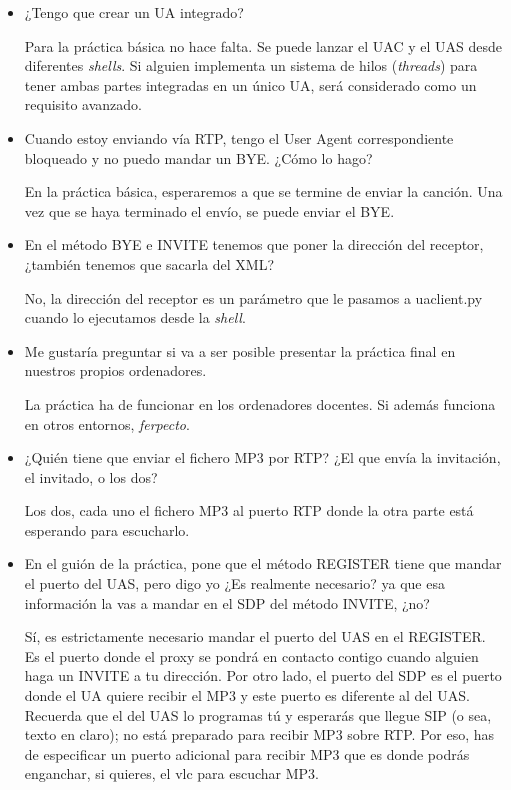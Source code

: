 \documentclass[a4paper,11pt]{article}
\begin{document}
\begin{itemize}

\item ¿Tengo que crear un UA integrado?

Para la práctica básica no hace falta. Se puede lanzar el UAC y el UAS desde diferentes \emph{shells}. Si alguien implementa un sistema de hilos (\emph{threads}) para tener ambas partes integradas en un único UA, será considerado como un requisito avanzado.

\item Cuando estoy enviando vía RTP, tengo el User Agent correspondiente bloqueado y no puedo mandar un BYE. ¿Cómo lo hago?

En la práctica básica, esperaremos a que se termine de enviar la canción. Una vez que se haya terminado el envío, se puede enviar el BYE.

\item En el método BYE e INVITE tenemos que poner la dirección del receptor, ¿también tenemos que sacarla del XML?

No, la dirección del receptor es un parámetro que le pasamos a uaclient.py cuando lo ejecutamos desde la \emph{shell}.

\item Me gustaría preguntar si va a ser posible presentar la práctica final en nuestros propios ordenadores.

La práctica ha de funcionar en los ordenadores docentes. Si además funciona
en otros entornos, \emph{ferpecto}.

\item ¿Quién tiene que enviar el fichero MP3 por RTP? ¿El que envía la invitación, el invitado, o los dos?

Los dos, cada uno el fichero MP3 al puerto RTP donde la otra parte está esperando para escucharlo.

\item En el guión de la práctica, pone que el
método REGISTER tiene que mandar el puerto del UAS, pero digo yo ¿Es
realmente necesario? ya que esa información la vas a mandar en el SDP
del método INVITE, ¿no?

Sí, es estrictamente necesario mandar el puerto del UAS en el REGISTER.
Es el puerto donde el proxy se pondrá en contacto contigo cuando alguien haga
un INVITE a tu dirección. Por otro lado, el puerto del SDP es el puerto donde el UA quiere recibir el MP3 y este puerto es diferente al del UAS. Recuerda que el del UAS lo programas tú y esperarás que llegue SIP (o sea, texto en claro); no está preparado para recibir MP3 sobre RTP. Por eso, has de especificar un puerto adicional para recibir MP3 que es donde podrás enganchar, si quieres, el vlc para escuchar MP3.


\end{itemize}
\end{document}
